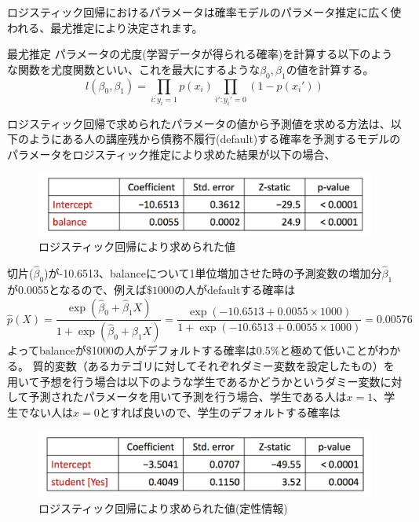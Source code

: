 \documentclass[uplatex]{jsarticle}
\begin{document}
ロジスティック回帰におけるパラメータは確率モデルのパラメータ推定に広く使われる、最尤推定により決定されます。
\begin{itembox}[l]{最尤推定}
  パラメータの尤度(学習データが得られる確率)を計算する以下のような関数を尤度関数といい、これを最大にするような$\beta_0, \beta_1$の値を計算する。
  $$l(\beta_0, \beta_1) = \prod_{i:y_i = 1}p(x_i)\prod_{i':y_i' = 0}(1 - p(x_i'))$$
\end{itembox}
ロジスティック回帰で求められたパラメータの値から予測値を求める方法は、以下のようにある人の講座残から債務不履行(default)する確率を予測するモデルのパラメータをロジスティック推定により求めた結果が以下の場合、
\begin{figure}
  \begin{center}
    \includegraphics[width=13cm]{img/logit.png}
    \caption{ロジスティック回帰により求められた値}
  \end{center}
\end{figure}
切片($\hat{\beta}_0$)が-10.6513、balanceについて1単位増加させた時の予測変数の増加分$\hat{\beta}_1$が0.0055となるので、例えば$\$ 1000$の人がdefaultする確率は
$$\hat{p}(X) = \frac{\exp{(\hat{\beta}_0 + \hat{\beta}_1 X)}}{1 + \exp{(\hat{\beta}_0 + \hat{\beta}_1 X)}} = \frac{\exp{(-10.6513 + 0.0055 \times 1000)}}{1 + \exp{(-10.6513 + 0.0055 \times 1000)}} = 0.00576$$
よってbalanceが$\$$1000の人がデフォルトする確率は0.5$\%$と極めて低いことがわかる。
質的変数（あるカテゴリに対してそれぞれダミー変数を設定したもの）を用いて予想を行う場合は以下のような学生であるかどうかというダミー変数に対して予測されたパラメータを用いて予測を行う場合、学生である人は$x = 1$、学生でない人は$x = 0$とすれば良いので、学生のデフォルトする確率は
\begin{figure}
  \begin{center}
    \includegraphics[width=13cm]{img/logit_quali.png}
    \caption{ロジスティック回帰により求められた値(定性情報)}
  \end{center}
\end{figure}
\end{document}
